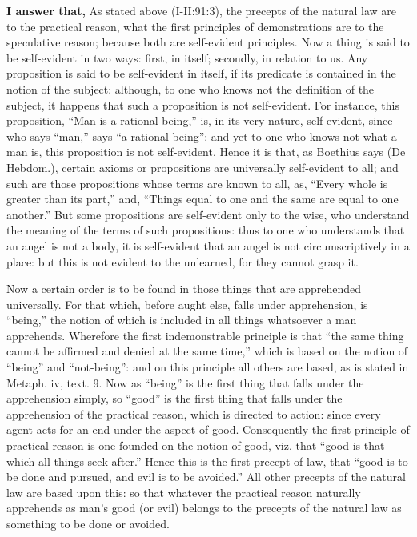 \textbf{I answer that,} As stated above (I-II:91:3), the precepts of the natural law are to the practical reason, what the first principles of demonstrations are to the speculative reason; because both are self-evident principles. Now a thing is said to be self-evident in two ways: first, in itself; secondly, in relation to us. Any proposition is said to be self-evident in itself, if its predicate is contained in the notion of the subject: although, to one who knows not the definition of the subject, it happens that such a proposition is not self-evident. For instance, this proposition, ``Man is a rational being,'' is, in its very nature, self-evident, since who says ``man,'' says ``a rational being'': and yet to one who knows not what a man is, this proposition is not self-evident. Hence it is that, as Boethius says (De Hebdom.), certain axioms or propositions are universally self-evident to all; and such are those propositions whose terms are known to all, as, ``Every whole is greater than its part,'' and, ``Things equal to one and the same are equal to one another.'' But some propositions are self-evident only to the wise, who understand the meaning of the terms of such propositions: thus to one who understands that an angel is not a body, it is self-evident that an angel is not circumscriptively in a place: but this is not evident to the unlearned, for they cannot grasp it.

Now a certain order is to be found in those things that are apprehended universally. For that which, before aught else, falls under apprehension, is ``being,'' the notion of which is included in all things whatsoever a man apprehends. Wherefore the first indemonstrable principle is that ``the same thing cannot be affirmed and denied at the same time,'' which is based on the notion of ``being'' and ``not-being'': and on this principle all others are based, as is stated in Metaph. iv, text. 9. Now as ``being'' is the first thing that falls under the apprehension simply, so ``good'' is the first thing that falls under the apprehension of the practical reason, which is directed to action: since every agent acts for an end under the aspect of good. Consequently the first principle of practical reason is one founded on the notion of good, viz. that ``good is that which all things seek after.'' Hence this is the first precept of law, that ``good is to be done and pursued, and evil is to be avoided.'' All other precepts of the natural law are based upon this: so that whatever the practical reason naturally apprehends as man's good (or evil) belongs to the precepts of the natural law as something to be done or avoided.

